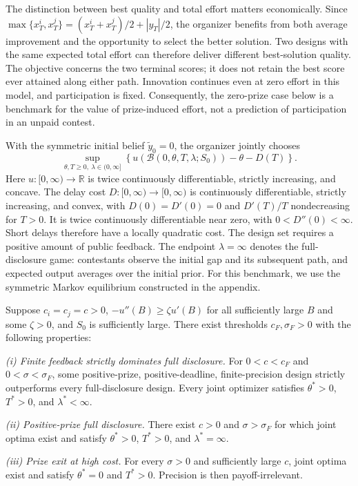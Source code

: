 \documentclass[mnsc]{informs3}
\begin{document}
The distinction between best quality and total effort matters economically. Since $\max\{x_T^i,x_T^j\}=(x_T^i+x_T^j)/2+|y_T|/2$, the organizer benefits from both average improvement and the opportunity to select the better solution. Two designs with the same expected total effort can therefore deliver different best-solution quality. The objective concerns the two terminal scores; it does not retain the best score ever attained along either path. Innovation continues even at zero effort in this model, and participation is fixed. Consequently, the zero-prize case below is a benchmark for the value of prize-induced effort, not a prediction of participation in an unpaid contest.



With the symmetric initial belief $\tilde y_0=0$, the organizer jointly chooses
\begin{equation}\label{eq-designer-best-output-objective}
\sup_{\theta,T\geq0,\ \lambda\in(0,\infty]}
\left\{u\!\left(\mathcal B(0,\theta,T,\lambda;S_0)\right)
-\theta-D(T)\right\}.
\end{equation}
Here $u:[0,\infty)\to\mathbb R$ is twice continuously differentiable, strictly increasing, and concave. The delay cost $D:[0,\infty)\to[0,\infty)$ is continuously differentiable, strictly increasing, and convex, with $D(0)=D'(0)=0$ and $D'(T)/T$ nondecreasing for $T>0$. It is twice continuously differentiable near zero, with $0<D''(0)<\infty$. Short delays therefore have a locally quadratic cost.
The design set requires a positive amount of public feedback. The endpoint $\lambda=\infty$ denotes the full-disclosure game: contestants observe the initial gap and its subsequent path, and expected output averages over the initial prior. For this benchmark, we use the symmetric Markov equilibrium constructed in the appendix.

\begin{proposition}\label{prop-joint-design}
{Suppose $c_i=c_j=c>0$, $-u''(B)\geq\zeta u'(B)$ for all sufficiently large $B$ and some $\zeta>0$, and $S_0$ is sufficiently large. There exist thresholds $c_F,\sigma_F>0$ with the following properties:}

{\emph{(i) Finite feedback strictly dominates full disclosure.}
For $0<c<c_F$ and $0<\sigma<\sigma_F$, some positive-prize,
positive-deadline, finite-precision design strictly outperforms every
full-disclosure design. Every joint optimizer satisfies $\theta^*>0$,
$T^*>0$, and $\lambda^*<\infty$.}

\emph{(ii) Positive-prize full disclosure.}
There exist $c>0$ and $\sigma>\sigma_F$ for which joint optima exist and satisfy $\theta^*>0$, $T^*>0$, and $\lambda^*=\infty$.

\emph{(iii) Prize exit at high cost.}
For every $\sigma>0$ and sufficiently large $c$, joint optima exist and satisfy $\theta^*=0$ and $T^*>0$. Precision is then payoff-irrelevant.
\end{proposition}
\end{document}

